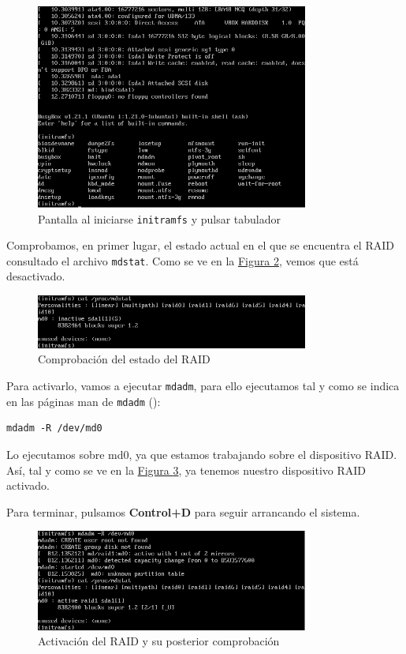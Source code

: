 \documentclass[10pt,a4paper,spanish]{article}
\numberwithin{equation}{section} %
\numberwithin{figure}{section} %
\numberwithin{table}{section} %
\begin{document}
\begin{figure}[!h]
\centering
\includegraphics[width=0.8\textwidth]{1_8}
\caption{Pantalla al iniciarse \texttt{initramfs} y pulsar tabulador}
\label{initramfs}
\end{figure}

Comprobamos, en primer lugar, el estado actual en el que se encuentra el RAID consultado el archivo \texttt{mdstat}. Como se ve en la \hyperref[inactive]{Figura \ref*{inactive}}, vemos que está desactivado.

\begin{figure}[!h]
\centering
\includegraphics[width=0.8\textwidth]{1_10}
\caption{Comprobación del estado del RAID}
\label{inactive}
\end{figure}

Para activarlo, vamos a ejecutar \texttt{mdadm}, para ello ejecutamos tal y como se indica en las páginas man de \texttt{mdadm} (\cite{mdadm}):

\begin{verbatim}
mdadm -R /dev/md0
\end{verbatim}

Lo ejecutamos sobre md0, ya que estamos trabajando sobre el dispositivo RAID. Así, tal y como se ve en la \hyperref[active]{Figura \ref*{active}}, ya tenemos nuestro dispositivo RAID activado. 

Para terminar, pulsamos \textbf{Control+D} para seguir arrancando el sistema.

\begin{figure}[!h]
\centering
\includegraphics[width=0.8\textwidth]{1_9}
\caption{Activación del RAID y su posterior comprobación}
\label{active}
\end{figure}
\end{document}
